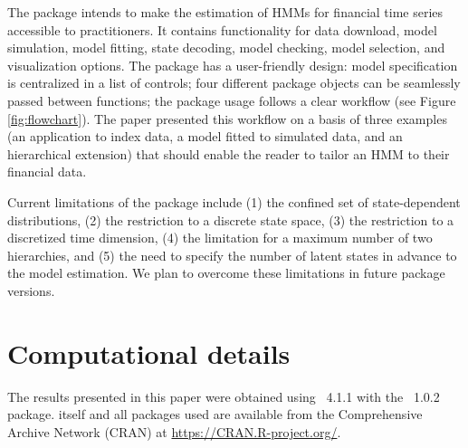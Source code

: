 \documentclass[article]{jss}
\begin{document}
The  package intends to make the estimation of HMMs for financial time series accessible to practitioners. It contains functionality for data download, model simulation, model fitting, state decoding, model checking, model selection, and visualization options. The package has a user-friendly design: model specification is centralized in a list of controls; four different package objects can be seamlessly passed between functions; the package usage follows a clear workflow (see Figure \ref{fig:flowchart}). The paper presented this workflow on a basis of three examples (an application to index data, a model fitted to simulated data, and an hierarchical extension) that should enable the reader to tailor an HMM to their financial data.

Current limitations of the  package include (1) the confined set of state-dependent distributions, (2) the restriction to a discrete state space, (3) the restriction to a discretized time dimension, (4) the limitation for a maximum number of two hierarchies, and (5) the need to specify the number of latent states in advance to the model estimation. We plan to overcome these limitations in future package versions.


\section*{Computational details}

The results presented in this paper were obtained using
~4.1.1 with the
~1.0.2 package.  itself
and all packages used are available from the Comprehensive
 Archive Network (CRAN) at \url{https://CRAN.R-project.org/}.



\end{document}
